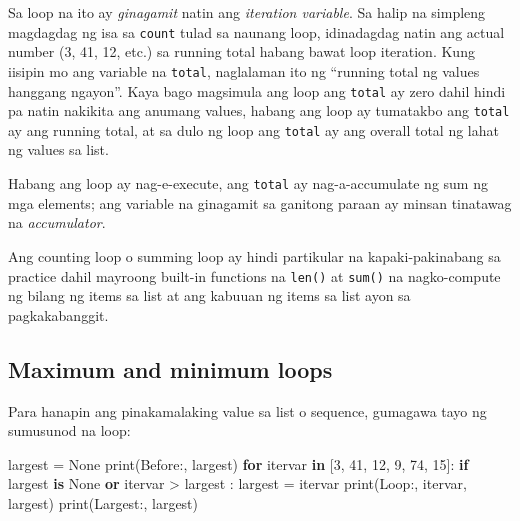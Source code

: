 \documentclass[10pt,]{book}
\newenvironment{Shaded}{}{}
\newcommand{\BuiltInTok}[1]{\textcolor[rgb]{0.00,0.50,0.00}{#1}}
\newcommand{\ControlFlowTok}[1]{\textcolor[rgb]{0.00,0.44,0.13}{\textbf{#1}}}
\newcommand{\DecValTok}[1]{\textcolor[rgb]{0.25,0.63,0.44}{#1}}
\newcommand{\KeywordTok}[1]{\textcolor[rgb]{0.00,0.44,0.13}{\textbf{#1}}}
\newcommand{\NormalTok}[1]{#1}
\newcommand{\OperatorTok}[1]{\textcolor[rgb]{0.40,0.40,0.40}{#1}}
\newcommand{\StringTok}[1]{\textcolor[rgb]{0.25,0.44,0.63}{#1}}
\newcommand{\VariableTok}[1]{\textcolor[rgb]{0.10,0.09,0.49}{#1}}
\begin{document}
Sa loop na ito ay \emph{ginagamit} natin ang \emph{iteration variable}.
Sa halip na simpleng magdagdag ng isa sa \texttt{count} tulad sa naunang
loop, idinadagdag natin ang actual number (3, 41, 12, etc.) sa running
total habang bawat loop iteration. Kung iisipin mo ang variable na
\texttt{total}, naglalaman ito ng ``running total ng values hanggang
ngayon''. Kaya bago magsimula ang loop ang \texttt{total} ay zero dahil
hindi pa natin nakikita ang anumang values, habang ang loop ay tumatakbo
ang \texttt{total} ay ang running total, at sa dulo ng loop ang
\texttt{total} ay ang overall total ng lahat ng values sa list.

Habang ang loop ay nag-e-execute, ang \texttt{total} ay nag-a-accumulate
ng sum ng mga elements; ang variable na ginagamit sa ganitong paraan ay
minsan tinatawag na \emph{accumulator}.


Ang counting loop o summing loop ay hindi partikular na
kapaki-pakinabang sa practice dahil mayroong built-in functions na
\texttt{len()} at \texttt{sum()} na nagko-compute ng bilang ng items sa
list at ang kabuuan ng items sa list ayon sa pagkakabanggit.

\subsection{Maximum and minimum loops}\label{maximum-and-minimum-loops}

  

Para hanapin ang pinakamalaking value sa list o sequence, gumagawa tayo
ng sumusunod na loop:

\begin{Shaded}
\begin{Highlighting}[]
\NormalTok{largest }\OperatorTok{=} \VariableTok{None}
\BuiltInTok{print}\NormalTok{(}\StringTok{\textquotesingle{}Before:\textquotesingle{}}\NormalTok{, largest)}
\ControlFlowTok{for}\NormalTok{ itervar }\KeywordTok{in}\NormalTok{ [}\DecValTok{3}\NormalTok{, }\DecValTok{41}\NormalTok{, }\DecValTok{12}\NormalTok{, }\DecValTok{9}\NormalTok{, }\DecValTok{74}\NormalTok{, }\DecValTok{15}\NormalTok{]:}
    \ControlFlowTok{if}\NormalTok{ largest }\KeywordTok{is} \VariableTok{None} \KeywordTok{or}\NormalTok{ itervar }\OperatorTok{\textgreater{}}\NormalTok{ largest :}
\NormalTok{        largest }\OperatorTok{=}\NormalTok{ itervar}
    \BuiltInTok{print}\NormalTok{(}\StringTok{\textquotesingle{}Loop:\textquotesingle{}}\NormalTok{, itervar, largest)}
\BuiltInTok{print}\NormalTok{(}\StringTok{\textquotesingle{}Largest:\textquotesingle{}}\NormalTok{, largest)}
\end{Highlighting}
\end{Shaded}
\end{document}
